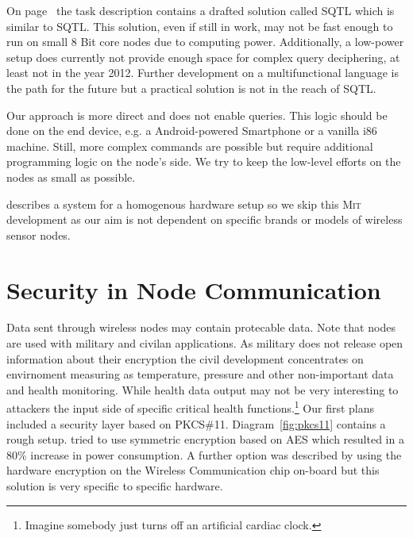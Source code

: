 On page~\pageref{chap:unify} the task description contains a drafted solution called \textsc{SQTL} which is similar to \textsc{SQTL}. This
solution, even if still in work, may not be fast enough to run on small 8 Bit core nodes due to computing power. Additionally, a low-power 
setup does currently not provide enough space for complex query deciphering, at least not in the year 2012. Further development on a 
multifunctional language is the path for the future but a practical solution is not in the reach of \textsc{SQTL}.

Our approach is more direct and does not enable queries. This logic should be done on the end device, e.g. a Android-powered Smartphone or a 
vanilla i86 machine. Still, more complex commands are possible but require additional programming logic on the node's side. We try to 
keep the low-level efforts on the nodes as small as possible.

\cite{Heinzelman00energy-efficientcommunication} describes a system for a homogenous hardware setup so we skip this \textsc{Mit} development as 
our aim is not dependent on specific brands or models of wireless sensor nodes.

\section{Security in Node Communication}

Data sent through wireless nodes may contain protecable data. Note that nodes are used with military and civilan applications. As military does
not release open information about their encryption the civil development concentrates on envirnoment measuring as temperature, pressure and other 
non-important data and health monitoring.\cite{Dispert}
While health data output may not be very interesting to attackers the input side of specific critical health functions.\footnote{Imagine somebody 
just turns off an artificial cardiac clock.}
Our first plans included a security layer based on \textsc{PKCS\#11}. Diagram~\ref{fig:pkcs11} contains a rough setup. \cite{wsnsec} tried to 
use symmetric encryption based on \textsc{AES} which resulted in a 80\% increase in power consumption. A further option was described by 
using the hardware encryption on the Wireless Communication chip on-board but this solution is very specific to specific hardware.

